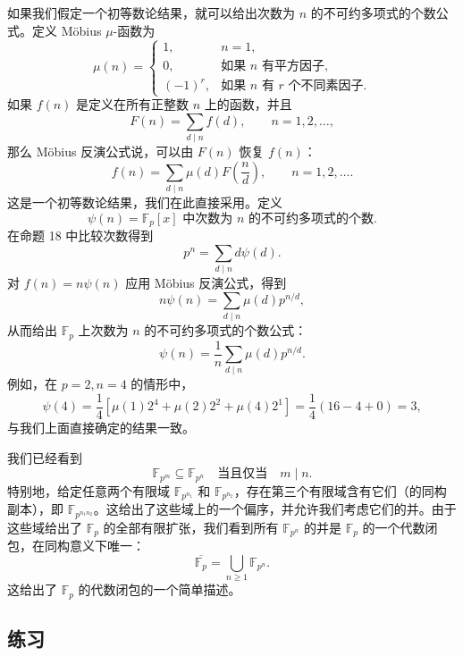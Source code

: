 如果我们假定一个初等数论结果，就可以给出次数为 $n$ 的不可约多项式的个数公式。定义 Möbius $\mu$-函数为
\[
\mu(n)=
\begin{cases}
1, & n=1,\\
0, & \text{如果 } n \text{ 有平方因子},\\
(-1)^r, & \text{如果 } n \text{ 有 } r \text{ 个不同素因子}.
\end{cases}
\]
如果 $f(n)$ 是定义在所有正整数 $n$ 上的函数，并且
\[
F(n)=\sum_{d\mid n} f(d),\qquad n=1,2,\ldots,
\]
那么 Möbius 反演公式说，可以由 $F(n)$ 恢复 $f(n)$：
\[
f(n)=\sum_{d\mid n}\mu(d)F\left(\frac{n}{d}\right),\qquad n=1,2,\ldots.
\]
这是一个初等数论结果，我们在此直接采用。定义
\[
\psi(n)=\text{$\mathbb F_p[x]$ 中次数为 $n$ 的不可约多项式的个数}.
\]
在命题 18 中比较次数得到
\[
p^n=\sum_{d\mid n} d\psi(d).
\]
对 $f(n)=n\psi(n)$ 应用 Möbius 反演公式，得到
\[
n\psi(n)=\sum_{d\mid n}\mu(d)p^{n/d},
\]
从而给出 $\mathbb F_p$ 上次数为 $n$ 的不可约多项式的个数公式：
\[
\psi(n)=\frac1n\sum_{d\mid n}\mu(d)p^{n/d}.
\]
例如，在 $p=2,n=4$ 的情形中，
\[
\psi(4)=\frac14[\mu(1)2^4+\mu(2)2^2+\mu(4)2^1]
=\frac14(16-4+0)=3,
\]
与我们上面直接确定的结果一致。

我们已经看到
\[
\mathbb F_{p^m}\subseteq \mathbb F_{p^n}\quad\text{当且仅当}\quad m\mid n.
\]
特别地，给定任意两个有限域 $\mathbb F_{p^{n_1}}$ 和 $\mathbb F_{p^{n_2}}$，存在第三个有限域含有它们（的同构副本），即 $\mathbb F_{p^{n_1n_2}}$。这给出了这些域上的一个偏序，并允许我们考虑它们的并。由于这些域给出了 $\mathbb F_p$ 的全部有限扩张，我们看到所有 $\mathbb F_{p^n}$ 的并是 $\mathbb F_p$ 的一个代数闭包，在同构意义下唯一：
\[
\overline{\mathbb F_p}=\bigcup_{n\geq 1}\mathbb F_{p^n}.
\]
这给出了 $\mathbb F_p$ 的代数闭包的一个简单描述。

\subsection*{练习}

